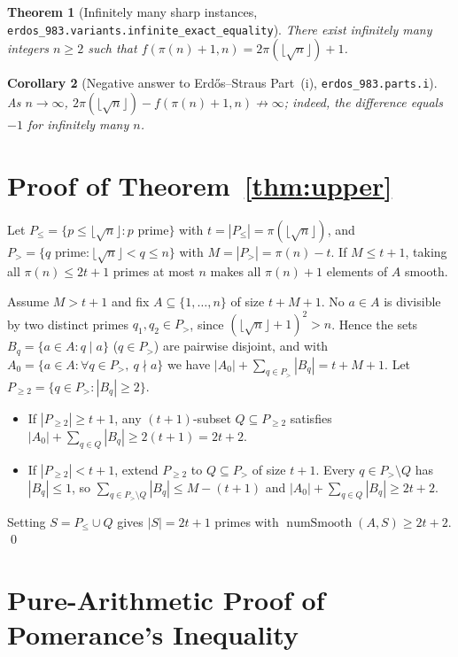 \documentclass[11pt]{amsart}
\newtheorem{theorem}{Theorem}
\newtheorem{corollary}[theorem]{Corollary}
\begin{document}
\begin{theorem}[Infinitely many sharp instances, \texttt{erdos\_983.variants.infinite\_exact\_equality}]\label{thm:sharp}
There exist infinitely many integers $n \ge 2$ such that $f(\pi(n)+1, n) = 2\pi(\lfloor\sqrt{n}\rfloor) + 1$.
\end{theorem}

\begin{corollary}[Negative answer to Erd\H{o}s--Straus Part~(i), \texttt{erdos\_983.parts.i}]\label{cor:part1}
As $n \to \infty$, $2\pi(\lfloor\sqrt{n}\rfloor) - f(\pi(n)+1, n) \not\to \infty$; indeed, the difference equals $-1$ for infinitely many $n$.
\end{corollary}

\section{Proof of Theorem~\ref{thm:upper}}

Let $P_{\le} = \{p \le \lfloor\sqrt{n}\rfloor : p\text{ prime}\}$ with $t = |P_{\le}| = \pi(\lfloor\sqrt{n}\rfloor)$, and $P_{>} = \{q \text{ prime} : \lfloor\sqrt{n}\rfloor < q \le n\}$ with $M = |P_{>}| = \pi(n) - t$. If $M \le t+1$, taking all $\pi(n) \le 2t+1$ primes at most $n$ makes all $\pi(n)+1$ elements of $A$ smooth.

Assume $M > t+1$ and fix $A \subseteq \{1,\dots,n\}$ of size $t + M + 1$. No $a \in A$ is divisible by two distinct primes $q_1, q_2 \in P_{>}$, since $(\lfloor\sqrt{n}\rfloor+1)^2 > n$. Hence the sets $B_q = \{a \in A : q \mid a\}$ ($q \in P_{>}$) are pairwise disjoint, and with $A_0 = \{a \in A : \forall q \in P_{>},\ q \nmid a\}$ we have $|A_0| + \sum_{q \in P_{>}} |B_q| = t + M + 1$. Let $P_{\ge 2} = \{q \in P_{>} : |B_q| \ge 2\}$.
\begin{itemize}
  \item If $|P_{\ge 2}| \ge t+1$, any $(t+1)$-subset $Q \subseteq P_{\ge 2}$ satisfies $|A_0| + \sum_{q \in Q}|B_q| \ge 2(t+1) = 2t+2$.
  \item If $|P_{\ge 2}| < t+1$, extend $P_{\ge 2}$ to $Q \subseteq P_{>}$ of size $t+1$. Every $q \in P_{>} \setminus Q$ has $|B_q| \le 1$, so $\sum_{q \in P_{>} \setminus Q} |B_q| \le M - (t+1)$ and $|A_0| + \sum_{q \in Q}|B_q| \ge 2t+2$.
\end{itemize}
Setting $S = P_{\le} \cup Q$ gives $|S| = 2t+1$ primes with $\operatorname{numSmooth}(A,S) \ge 2t+2$. \qed

\section{Pure-Arithmetic Proof of Pomerance's Inequality}
\end{document}

